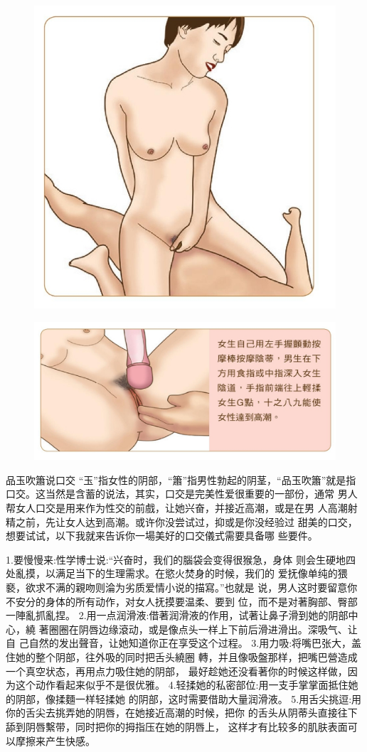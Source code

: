 \documentclass[12pt,UTF8]{ctexbook}
\begin{document}
\begin{figure}[htbp]
	\centering
	\includegraphics[width=0.7\linewidth]{17}
	\caption{}
	\label{fig:1}
\end{figure}

\begin{figure}[htbp]
	\centering
	\includegraphics[width=0.7\linewidth]{18}
	\caption{}
	\label{fig:1}
\end{figure}

品玉吹簫说口交
“玉”指女性的阴部，“簫”指男性勃起的阴茎，“品玉吹簫”就是指
口交。这当然是含蓄的说法，其实，口交是完美性爱很重要的一部份，通常
男人帮女人口交是用来作为性交的前戲，让她兴奋，并接近高潮，或是在男
人高潮射精之前，先让女人达到高潮。或许你没尝试过，抑或是你没经验过
甜美的口交，想要试试，以下我就来告诉你一場美好的口交儀式需要具备哪
些要件。

1.要慢慢来:性学博士说:“兴奋时，我们的腦袋会变得很猴急，身体
则会生硬地四处亂摸，以满足当下的生理需求。在慾火焚身的时候，我们的
爱抚像单纯的猥褻，欲求不满的親吻则淪为劣质爱情小说的描寫。”也就是
说，男人这时要留意你不安分的身体的所有动作，对女人抚摸要温柔、要到
位，而不是对著胸部、臀部一陣亂抓亂捏。
2.用一点润滑液:借著润滑液的作用，试著让鼻子滑到她的阴部中心，繞
著圈圈在阴唇边缘滾动，或是像点头一样上下前后滑进滑出。深吸气、让自
己自然的发出聲音，让她知道你正在享受这个过程。
3.用力吸:将嘴巴张大，盖住她的整个阴部，往外吸的同时把舌头繞圈
轉，并且像吸盤那样，把嘴巴營造成一个真空状态，再用点力吸住她的阴部，
最好趁她还没看著你的时候这样做，因为这个动作看起来似乎不是很优雅。
4.轻揉她的私密部位:用一支手掌掌面抵住她的阴部，像揉麵一样轻揉她
的阴部，这时需要借助大量润滑液。
5.用舌尖挑逗:用你的舌尖去挑弄她的阴唇，在她接近高潮的时候，把你
的舌头从阴蒂头直接往下舔到阴唇繫带，同时把你的拇指压在她的阴唇上，
这样才有比较多的肌肤表面可以摩擦来产生快感。
\end{document}
